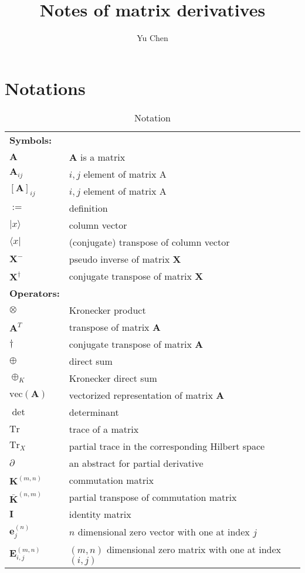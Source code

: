 \documentclass[a4paper,11pt]{article}
\title{\boldmath Notes of matrix derivatives}
\author[a]{Yu Chen}
\affiliation[a]{Tencent Company}
\def\tr{\mathrm{Tr}}
\def\m#1{\mathbf{#1}}
\def\v#1{\mathrm{vec}({\mathbf{#1}})}
\begin{document}
 
\maketitle
\flushbottom

\section{Notations}
\begin{table}[h]
    \caption{Notation}
    \begin{tabularx}{\textwidth}{p{}X}
    \toprule
    \textbf{Symbols:} & \\
    $\m A$ & $\m A$ is a matrix \\
    $\m A_{ij}$ & $i,j$ element of matrix A \\ 
    $[\m A]_{ij}$ & $i,j$ element of matrix A \\
    $:=$ & definition \\
    $|x\rangle$ & column vector \\
    $\langle x|$ & (conjugate) transpose of column vector \\
    $\m X^{-}$ & pseudo inverse of matrix $\m X$ \\
    $\m X^{\dagger}$ & conjugate transpose of matrix $\m X$ \\
    
    \textbf{Operators:} & \\
    $\otimes$ & Kronecker product \\
    $\m A^T$ & transpose of matrix $\m A$ \\ 
    $\m \dagger$ & conjugate transpose of matrix $\m A$ \\
    $\oplus$ & direct sum \\
    $\oplus_K$ & Kronecker direct sum \\
    $\v A$ & vectorized representation of matrix $\m A$ \\
    $\det $ & determinant \\
    $\tr$ & trace of a matrix \\
    $\tr_X$ & partial trace in the corresponding Hilbert space \\
    $\partial$ & an abstract for partial derivative \\ 
    $\m K^{(m, n)}$ & commutation matrix \\ 
    $\bar{\m K}^{(n,m)}$ & partial transpose of commutation matrix \\ 
    $\m I$ & identity matrix \\ 
    $\m e^{(n)}_j$ & $n$ dimensional zero vector with one at index $j$ \\
    $\m E^{(m,n)}_{i,j}$  & $(m,n)$ dimensional zero matrix with one at index $(i,j)$ \\
    \bottomrule
    \end{tabularx}
\end{table}
\end{document}
